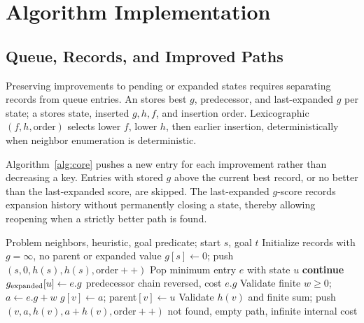 \section{Algorithm Implementation}
\subsection{Queue, Records, and Improved Paths}
Preserving improvements to pending or expanded states requires separating records from queue entries. An  stores best $g$, predecessor, and last-expanded $g$ per state; a  stores state, inserted $g,h,f$, and insertion order. Lexicographic $(f,h,\mathrm{order})$ selects lower $f$, lower $h$, then earlier insertion, deterministically when neighbor enumeration is deterministic.

\begin{samepage}
Algorithm~\ref{alg:core} pushes a new entry for each improvement rather than decreasing a key. Entries with stored $g$ above the current best record, or no better than the last-expanded score, are skipped. The last-expanded $g$-score records expansion history without permanently closing a state, thereby allowing reopening when a strictly better path is found.
\par\end{samepage}

\begin{algorithm}[H]
\caption{Shared C++ search (trace and counters omitted)}\label{alg:core}
\begin{algorithmic}[1]
\Require Problem neighbors, heuristic, goal predicate; start $s$, goal $t$
\State Initialize records with $g=\infty$, no parent or expanded value
\State $g[s]\gets0$; push $(s,0,h(s),h(s),\mathrm{order}{+}{+})$
  \State Pop minimum entry $e$ with state $u$
    \State \textbf{continue}
  \EndIf
  \State $g_{\rm expanded}[u]\gets e.g$
    \State \Return predecessor chain reversed, cost $e.g$
  \EndIf
    \State Validate finite $w\geq0$; $a\gets e.g+w$
      \State $g[v]\gets a$; parent$[v]\gets u$
      \State Validate $h(v)$ and finite sum; push $(v,a,h(v),a+h(v),\mathrm{order}{+}{+})$
    \EndIf
  \EndFor
\EndWhile
\State \Return not found, empty path, infinite internal cost
\end{algorithmic}
\end{algorithm}

